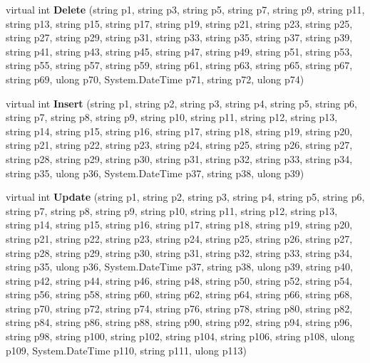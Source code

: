 \begin{DoxyCompactItemize}
\item 
virtual int {\bfseries Delete} (string p1, string p3, string p5, string p7, string p9, string p11, string p13, string p15, string p17, string p19, string p21, string p23, string p25, string p27, string p29, string p31, string p33, string p35, string p37, string p39, string p41, string p43, string p45, string p47, string p49, string p51, string p53, string p55, string p57, string p59, string p61, string p63, string p65, string p67, string p69, ulong p70, System.\+Date\+Time p71, string p72, ulong p74)\hypertarget{class_products_1_1_data_1_1ds_sage_table_adapters_1_1ta_product_detail_a6a269a0a921545520cc35be2d837f90d}{}\label{class_products_1_1_data_1_1ds_sage_table_adapters_1_1ta_product_detail_a6a269a0a921545520cc35be2d837f90d}

\item 
virtual int {\bfseries Insert} (string p1, string p2, string p3, string p4, string p5, string p6, string p7, string p8, string p9, string p10, string p11, string p12, string p13, string p14, string p15, string p16, string p17, string p18, string p19, string p20, string p21, string p22, string p23, string p24, string p25, string p26, string p27, string p28, string p29, string p30, string p31, string p32, string p33, string p34, string p35, ulong p36, System.\+Date\+Time p37, string p38, ulong p39)\hypertarget{class_products_1_1_data_1_1ds_sage_table_adapters_1_1ta_product_detail_a725332834a1c63910f1fed94d647153e}{}\label{class_products_1_1_data_1_1ds_sage_table_adapters_1_1ta_product_detail_a725332834a1c63910f1fed94d647153e}

\item 
virtual int {\bfseries Update} (string p1, string p2, string p3, string p4, string p5, string p6, string p7, string p8, string p9, string p10, string p11, string p12, string p13, string p14, string p15, string p16, string p17, string p18, string p19, string p20, string p21, string p22, string p23, string p24, string p25, string p26, string p27, string p28, string p29, string p30, string p31, string p32, string p33, string p34, string p35, ulong p36, System.\+Date\+Time p37, string p38, ulong p39, string p40, string p42, string p44, string p46, string p48, string p50, string p52, string p54, string p56, string p58, string p60, string p62, string p64, string p66, string p68, string p70, string p72, string p74, string p76, string p78, string p80, string p82, string p84, string p86, string p88, string p90, string p92, string p94, string p96, string p98, string p100, string p102, string p104, string p106, string p108, ulong p109, System.\+Date\+Time p110, string p111, ulong p113)\hypertarget{class_products_1_1_data_1_1ds_sage_table_adapters_1_1ta_product_detail_a6875730af506a040f05a0873e1f0140f}{}\label{class_products_1_1_data_1_1ds_sage_table_adapters_1_1ta_product_detail_a6875730af506a040f05a0873e1f0140f}


\end{DoxyCompactItemize}
